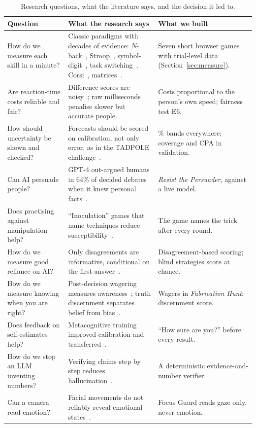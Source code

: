 \documentclass[11pt,a4paper]{article}
\begin{document}
\begin{table}[H]
\centering\small
\caption{Research questions, what the literature says, and the decision it led to.}
\label{tab:research}
\begin{tabularx}{\linewidth}{@{}>{\raggedright}p{3.6cm} >{\raggedright}X >{\raggedright\arraybackslash}p{4.3cm}@{}}
\toprule
Question & What the research says & What we built\\
\midrule
How do we measure each skill in a minute? & Classic paradigms with decades of evidence: $N$-back~\cite{kirchner,owen}, Stroop~\cite{stroop,macleod}, symbol-digit~\cite{smith,salthouse}, task switching~\cite{rogers}, Corsi~\cite{corsi,kessels}, matrices~\cite{raven,matzen}. & Seven short browser games with trial-level data (Section~\ref{sec:measure}).\\
Are reaction-time costs reliable and fair? & Difference scores are noisy~\cite{hedge}; raw milliseconds penalise slower but accurate people. & Costs proportional to the person's own speed; fairness test E6.\\
How should uncertainty be shown and checked? & Forecasts should be scored on calibration, not only error, as in the TADPOLE challenge~\cite{tadpole}. & 90\% bands everywhere; coverage and CPA in validation.\\
Can AI persuade people? & GPT-4 out-argued humans in 64\% of decided debates when it knew personal facts~\cite{salvi}. & \emph{Resist the Persuader}, against a live model.\\
Does practising against manipulation help? & ``Inoculation'' games that name techniques reduce susceptibility~\cite{roozenbeek}. & The game names the trick after every round.\\
How do we measure good reliance on AI? & Only disagreements are informative, conditional on the first answer~\cite{schemmer,leesee}. & Disagreement-based scoring; blind strategies score at chance.\\
How do we measure knowing when you are right? & Post-decision wagering measures awareness~\cite{persaud}; truth discernment separates belief from bias~\cite{pennycook}. & Wagers in \emph{Fabrication Hunt}; discernment score.\\
Does feedback on self-estimates help? & Metacognitive training improved calibration and transferred~\cite{carpenter}. & ``How sure are you?'' before every result.\\
How do we stop an LLM inventing numbers? & Verifying claims step by step reduces hallucination~\cite{cove}. & A deterministic evidence-and-number verifier.\\
Can a camera read emotion? & Facial movements do not reliably reveal emotional states~\cite{barrett}. & Focus Guard reads gaze only, never emotion.\\
\bottomrule
\end{tabularx}
\end{table}
\end{document}
